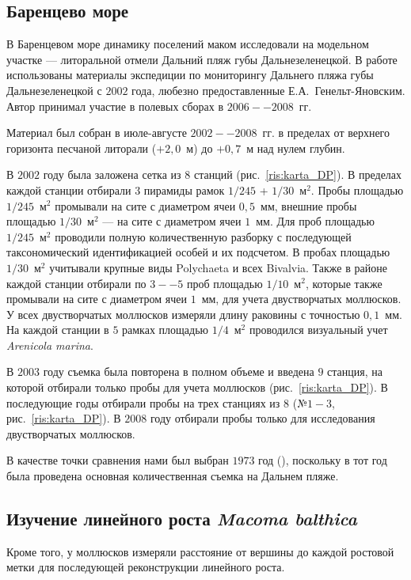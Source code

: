        \subsection{Баренцево море}

В Баренцевом море динамику поселений маком исследовали на модельном участке --- литоральной отмели Дальний пляж губы Дальнезеленецкой. 
В работе использованы материалы экспедиции по мониторингу Дальнего пляжа губы Дальнезеленецкой с $2002$ года, любезно предоставленные Е.\:А.~Генельт-Яновским.
Автор принимал участие в полевых сборах в $2006 -- 2008$~гг.

Материал был собран в июле-августе $2002 -- 2008$~гг. в пределах от верхнего горизонта песчаной литорали ($+2,0$~м) до $+0,7$~м над нулем глубин. 

 В $2002$ году была заложена сетка из $8$ станций (рис.~\ref{ris:karta_DP}). 
 В пределах каждой станции отбирали $3$ пирамиды рамок $1/245$ + $1/30$~м$^2$. 
 Пробы площадью $1/245$~м$^2$ промывали на сите с диаметром ячеи $0,5$~мм, внешние пробы площадью $1/30$~м$^2$ --- на сите с диаметром ячеи $1$~мм. 
 Для проб площадью $1/245$~м$^2$ проводили полную количественную разборку с последующей таксономический идентификацией особей и их подсчетом. 
 В пробах  площадью $1/30$~м$^2$ учитывали крупные виды Polychaeta и всех Bivalvia. 
 Также в районе каждой станции отбирали по $3--5$ проб площадью $1/10$~м$^2$, которые также промывали на сите с диаметром ячеи $1$~мм, для учета двустворчатых моллюсков.  
 У всех двустворчатых моллюсков измеряли длину раковины с точностью $0,1$~мм. 
 На каждой станции в $5$ рамках площадью $1/4$~м$^2$ проводился визуальный учет {\it Arenicola marina}.

 В $2003$ году съемка была повторена в полном объеме и введена $9$ станция, на которой отбирали только пробы для учета моллюсков (рис.~\ref{ris:karta_DP}). 
 В последующие годы отбирали пробы на трех станциях из $8$ (№$1-3$, рис.~\ref{ris:karta_DP}). 
 В $2008$ году отбирали пробы только для исследования двустворчатых моллюсков.

 В качестве точки сравнения нами был выбран $1973$ год (\cite{Streltsov_et_el_1974, Agarova_et_al_1976}), поскольку в тот год была проведена основная количественная съемка на Дальнем пляже. 




	\subsection{Изучение линейного роста {\it Macoma balthica}}

Кроме того, у моллюсков измеряли расстояние от вершины до каждой ростовой метки для последующей реконструкции линейного роста. 


